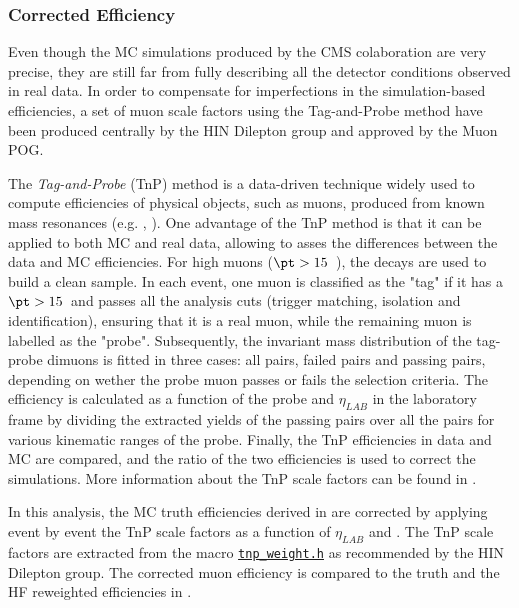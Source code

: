 

\clearpage
\subsubsection{Corrected Efficiency}\label{sec:WBoson_Analysis_CorrectedEfficiency}

Even though the MC simulations produced by the CMS colaboration are very precise, they are still far from fully describing all the detector conditions observed in real data. In order to compensate for imperfections in the simulation-based efficiencies, a set of muon scale factors using the Tag-and-Probe method have been produced centrally by the HIN Dilepton group and approved by the Muon POG.

The \textit{Tag-and-Probe} (TnP) method \cite{Muon_TnP} is a data-driven technique widely used to compute efficiencies of physical objects, such as muons, produced from known mass resonances (e.g. \JPsi, \Z). One advantage of the TnP method is that it can be applied to both MC and real data, allowing to asses the differences between the data and MC efficiencies. For high \pt muons ($\pt > 15$~\GeVc), the \ZToMuMu decays are used to build a clean sample. In each event, one muon is classified as the "tag" if it has a $\pt > 15$~\GeVc and passes all the analysis cuts (trigger matching, isolation and identification), ensuring that it is a real muon, while the remaining muon is labelled as the "probe". Subsequently, the invariant mass distribution of the tag-probe dimuons is fitted in three cases: all pairs, failed pairs and passing pairs, depending on wether the probe muon passes or fails the selection criteria. The efficiency is calculated as a function of the probe \pt and $\eta_{LAB}$ in the laboratory frame by dividing the extracted yields of the passing pairs over all the pairs for various kinematic ranges of the probe. Finally, the TnP efficiencies in data and MC are compared, and the ratio of the two efficiencies is used to correct the simulations. More information about the \pPb TnP scale factors can be found in \cite{Muon_TnP_pPb}.

In this analysis, the MC truth efficiencies derived in  are corrected by applying event by event the TnP scale factors as a function of $\eta_{LAB}$ and \pt. The TnP scale factors are extracted from the macro \href{https://github.com/CMS-HIN-dilepton/MuonAnalysis-TagAndProbe/blob/80X_HI/macros/tnp_weight.h}{\texttt{tnp\_weight.h}} as recommended by the HIN Dilepton group. The corrected muon efficiency is compared to the truth and the HF reweighted efficiencies in .


